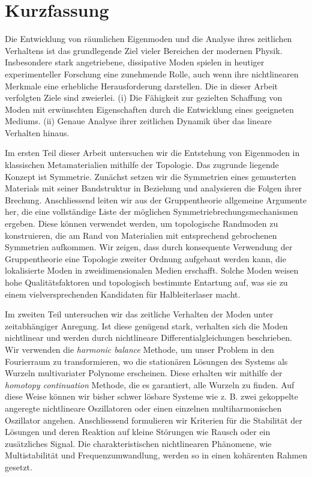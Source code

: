 
\chapter*{Kurzfassung}

Die Entwicklung von räumlichen Eigenmoden und die Analyse ihres zeitlichen Verhaltens ist das grundlegende Ziel vieler Bereichen der modernen Physik. Insbesondere stark angetriebene, dissipative Moden spielen in heutiger experimenteller Forschung eine zunehmende Rolle, auch wenn ihre nichtlinearen Merkmale eine erhebliche Herausforderung darstellen. Die in dieser Arbeit verfolgten Ziele sind zweierlei. (i) Die Fähigkeit zur gezielten Schaffung von Moden mit erwünschten Eigenschaften durch die Entwicklung eines geeigneten Mediums. (ii) Genaue Analyse ihrer zeitlichen Dynamik über das lineare Verhalten hinaus. 

Im ersten Teil dieser Arbeit untersuchen wir die Entstehung von Eigenmoden in klassischen Metamaterialien mithilfe der Topologie. Das zugrunde liegende Konzept ist Symmetrie. Zunächst setzen wir die Symmetrien eines gemusterten Materials mit seiner Bandstruktur in Beziehung und analysieren die Folgen ihrer Brechung. Anschliessend leiten wir aus der Gruppentheorie allgemeine Argumente her, die eine vollständige Liste der möglichen Symmetriebrechungsmechanismen ergeben. Diese können verwendet werden, um topologische Randmoden zu konstruieren, die am Rand von Materialien mit entsprechend gebrochenen Symmetrien aufkommen. Wir zeigen, dass durch konsequente Verwendung der Gruppentheorie eine Topologie zweiter Ordnung aufgebaut werden kann, die lokalisierte Moden in zweidimensionalen Medien erschafft. Solche Moden weisen hohe Qualitätsfaktoren und topologisch bestimmte Entartung auf, was sie zu einem vielversprechenden Kandidaten für Halbleiterlaser macht.

Im zweiten Teil untersuchen wir das zeitliche Verhalten der Moden unter zeitabhängiger Anregung. Ist diese genügend stark, verhalten sich die Moden nichtlinear und werden durch nichtlineare Differentialgleichungen beschrieben. Wir verwenden die \textit{harmonic balance} Methode, um unser Problem in den Fourierraum zu transformieren, wo die stationären Lösungen des Systems als Wurzeln multivariater Polynome erscheinen. Diese erhalten wir mithilfe der \textit{homotopy continuation} Methode, die es garantiert, alle Wurzeln zu finden. Auf diese Weise können wir bisher schwer lösbare Systeme wie z. B. zwei gekoppelte angeregte nichtlineare Oszillatoren oder einen einzelnen multiharmonischen Oszillator angehen. Anschliessend formulieren wir Kriterien für die Stabilität der Lösungen und deren Reaktion auf kleine Störungen wie Rausch oder ein zusätzliches Signal. Die charakteristischen nichtlinearen Phänomene, wie Multistabilität und Frequenzumwandlung, werden so in einen kohärenten Rahmen gesetzt.

